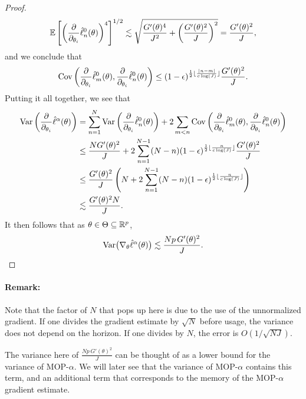 \begin{proof}
\begin{equation}
\mathbb{E}\left[\left(\frac{\partial}{\partial_{\theta_i}}\hat\ell_n^0(\theta)\right)^4\right]^{1/2} \lesssim  \sqrt{\frac{G'(\theta)^4}{J^2}+\left(\frac{G'(\theta)^2}{J}\right)^2} = \frac{G'(\theta)^2}{J},
\end{equation}
and we conclude that 
\begin{equation}
\mathrm{Cov}\left(\frac{\partial}{\partial_{\theta_i}}\hat\ell_m^0(\theta), \frac{\partial}{\partial_{\theta_i}}\hat\ell_n^0(\theta)\right) \leq (1-\epsilon)^{\frac{1}{2}\lfloor \frac{|n-m|}{c\log(J)} \rfloor}\frac{G'(\theta)^2}{J}.
\end{equation}
Putting it all together, we see that
\begin{align}
    \mathrm{Var}\left(\frac{\partial}{\partial_{\theta_i}} \hat\ell^\alpha(\theta)\right) &= \sum_{n=1}^N \mathrm{Var}\left(\frac{\partial}{\partial_{\theta_i}}\hat\ell_n^0(\theta)\right) + 2\sum_{m<n} \mathrm{Cov}\left(\frac{\partial}{\partial_{\theta_i}}\hat\ell_m^0(\theta),\frac{\partial}{\partial_{\theta_i}}\hat\ell_n^0(\theta)\right)\\
    &\leq \frac{NG'(\theta)^2}{J} + 2\sum_{n=1}^{N-1} (N-n)(1-\epsilon)^{\frac{1}{2}\lfloor \frac{n}{c\log(J)} \rfloor}\frac{G'(\theta)^2}{J} \\
    &\leq \frac{G'(\theta)^2}{J} \left(N + 2\sum_{n=1}^{N-1} (N-n) (1-\epsilon)^{\frac{1}{2}\lfloor \frac{n}{c\log(J)} \rfloor}\right) \\
    &\lesssim \frac{G'(\theta)^2N}{J}.
\end{align}
It then follows that as $\theta \in \Theta \subseteq \mathbb{R}^p$, 
\begin{equation}
    \mathrm{Var}\big(\nabla_{\theta} \hat\ell^\alpha(\theta)\big) \lesssim \frac{Np \, G'(\theta)^2}{J}.
\end{equation}
\end{proof}


\paragraph{Remark:} Note that the factor of $N$ that pops up here is due to the use of the unnormalized gradient. If one divides the gradient estimate by $\sqrt{N}$ before usage, the variance does not depend on the horizon. If one divides by $N$, the error is $O(1/\sqrt{NJ})$.

The variance here of $\frac{Np \, G'(\theta)^2}{J}$ can be thought of as a lower bound for the variance of MOP-$\alpha$. We will later see that the variance of MOP-$\alpha$ contains this term, and an additional term that corresponds to the memory of the MOP-$\alpha$ gradient estimate.


